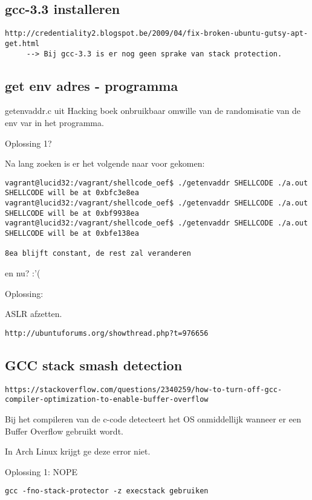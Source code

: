 \subsection{gcc-3.3 installeren}
\begin{lstlisting}
http://credentiality2.blogspot.be/2009/04/fix-broken-ubuntu-gutsy-apt-get.html
     --> Bij gcc-3.3 is er nog geen sprake van stack protection.
\end{lstlisting}

\subsection{get env adres - programma}
getenvaddr.c uit Hacking boek onbruikbaar omwille van de randomisatie van de env var in het programma.

Oplossing 1?

Na lang zoeken is er het volgende naar voor gekomen:
\begin{lstlisting}
vagrant@lucid32:/vagrant/shellcode_oef$ ./getenvaddr SHELLCODE ./a.out 
SHELLCODE will be at 0xbfc3e8ea
vagrant@lucid32:/vagrant/shellcode_oef$ ./getenvaddr SHELLCODE ./a.out 
SHELLCODE will be at 0xbf9938ea
vagrant@lucid32:/vagrant/shellcode_oef$ ./getenvaddr SHELLCODE ./a.out 
SHELLCODE will be at 0xbfe138ea

8ea blijft constant, de rest zal veranderen
\end{lstlisting}

en nu? :'(

Oplossing:

ASLR afzetten.

\begin{lstlisting}
http://ubuntuforums.org/showthread.php?t=976656
\end{lstlisting}


\subsection{GCC stack smash detection}
\begin{lstlisting}
https://stackoverflow.com/questions/2340259/how-to-turn-off-gcc-compiler-optimization-to-enable-buffer-overflow
\end{lstlisting}

Bij het compileren van de c-code detecteert het OS onmiddellijk wanneer er een Buffer Overflow gebruikt wordt.

In Arch Linux krijgt ge deze error niet.

Oplossing 1: NOPE
\begin{lstlisting}
gcc -fno-stack-protector -z execstack gebruiken
\end{lstlisting}

